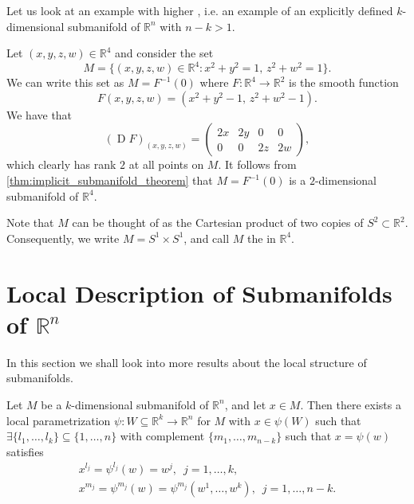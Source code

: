 \documentclass[notoc,notitlepage]{tufte-book}
\DeclareMathOperator{\D}{D}
\begin{document}
Let us look at an example with higher , i.e. an example of
an explicitly defined $k$-dimensional submanifold of $\mathbb{R}^n$ with $n - k
> 1$.

\begin{eg}
  Let $(x, y, z, w) \in \mathbb{R}^4$ and consider the set
  \begin{equation*}
    M = \{ (x, y, z, w) \in \mathbb{R}^4 : x^2 + y^2 = 1, \, z^2 + w^2 = 1 \}.
  \end{equation*}
  We can write this set as $M = F^{-1}(0)$ where $F : \mathbb{R}^4 \to
  \mathbb{R}^2$ is the smooth function
  \begin{equation*}
    F(x, y, z, w) = (x^2 + y^2 - 1, \, z^2 + w^2 - 1).
  \end{equation*}
  We have that
  \begin{equation*}
    (\D F)_{(x, y, z, w)} = \begin{pmatrix}
      2x & 2y & 0  & 0 \\
      0  & 0  & 2z & 2w
    \end{pmatrix},
  \end{equation*}
  which clearly has rank $2$ at all points on $M$. It follows from
  \cref{thm:implicit_submanifold_theorem} that $M =
  F^{-1}(0)$ is a $2$-dimensional submanifold of $\mathbb{R}^4$.

  Note that $M$ can be thought of as the Cartesian product of two copies of $S^2
  \subset \mathbb{R}^2$. Consequently, we write $M = S^1 \times S^1$, and call
  $M$ the  in $\mathbb{R}^4$.
\end{eg}


\section{Local Description of Submanifolds of \texorpdfstring{$\mathbb{R}^n$}{Rn}}%
\label{sec:local_description_of_submanifolds_of_r_n_}

In this section we shall look into more results about the local structure of
submanifolds.

\begin{thm}\label{thm:points_on_the_parametrization}
  Let $M$ be a $k$-dimensional submanifold of $\mathbb{R}^n$, and let $x \in M$.
  Then there exists a local parametrization $\psi : W \subseteq \mathbb{R}^k \to
  \mathbb{R}^n$ for $M$ with $x \in \psi(W)$ such that $\exists \{ l_1, \ldots,
  l_k \} \subseteq \{ 1, \ldots, n \}$ with complement $\{ m_1, \ldots, m_{n -
  k} \}$ such that $x = \psi(w)$ satisfies
  \begin{gather*}
    x^{l_j} = \psi^{l_j}(w) = w^j, \enspace j = 1, \ldots, k, \\
    x^{m_j} = \psi^{m_j}(w) = \psi^{m_j} (w^1, \ldots, w^k), \enspace j = 1,
    \ldots, n - k.
  \end{gather*}
\end{thm}
\end{document}
